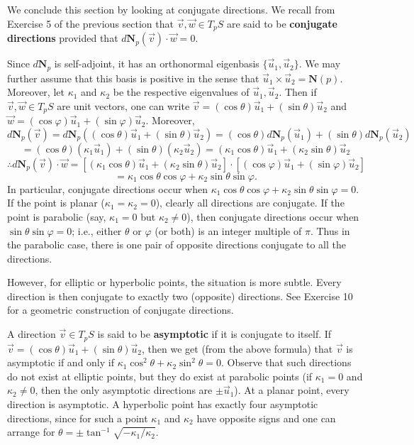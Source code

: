 \documentclass[leqno]{book}
\begin{document}
\noindent We conclude this section by looking at conjugate directions.  We recall from Exercise 5 of the previous section that $\vec v,\vec w\in T_pS$ are said to be \textbf{conjugate directions} provided that $d\mathbf N_p(\vec v)\cdot\vec w=0$.

Since $d\mathbf N_p$ is self-adjoint, it has an orthonormal eigenbasis $\{\vec u_1,\vec u_2\}$.  We may further assume that this basis is positive in the sense that $\vec u_1\times\vec u_2=\mathbf N(p)$.  Moreover, let $\kappa_1$ and $\kappa_2$ be the respective eigenvalues of $\vec u_1,\vec u_2$.  Then if $\vec v,\vec w\in T_pS$ are unit vectors, one can write $\vec v=(\cos\theta)\vec u_1+(\sin\theta)\vec u_2$ and $\vec w=(\cos\varphi)\vec u_1+(\sin\varphi)\vec u_2$.  Moreover,
$$d\mathbf N_p(\vec v)=d\mathbf N_p((\cos\theta)\vec u_1+(\sin\theta)\vec u_2)=(\cos\theta)d\mathbf N_p(\vec u_1)+(\sin\theta)d\mathbf N_p(\vec u_2)$$
$$=(\cos\theta)(\kappa_1\vec u_1)+(\sin\theta)(\kappa_2\vec u_2)=(\kappa_1\cos\theta)\vec u_1+(\kappa_2\sin\theta)\vec u_2$$
$$\therefore d\mathbf N_p(\vec v)\cdot\vec w=[(\kappa_1\cos\theta)\vec u_1+(\kappa_2\sin\theta)\vec u_2]\cdot[(\cos\varphi)\vec u_1+(\sin\varphi)\vec u_2]$$
$$=\kappa_1\cos\theta\cos\varphi+\kappa_2\sin\theta\sin\varphi.$$
In particular, conjugate directions occur when $\kappa_1\cos\theta\cos\varphi+\kappa_2\sin\theta\sin\varphi=0$.  If the point is planar ($\kappa_1=\kappa_2=0$), clearly all directions are conjugate.  If the point is parabolic (say, $\kappa_1=0$ but $\kappa_2\ne 0$), then conjugate directions occur when $\sin\theta\sin\varphi=0$; i.e., either $\theta$ or $\varphi$ (or both) is an integer multiple of $\pi$.  Thus in the parabolic case, there is one pair of opposite directions conjugate to all the directions.

However, for elliptic or hyperbolic points, the situation is more subtle.  Every direction is then conjugate to exactly two (opposite) directions.  See Exercise 10 for a geometric construction of conjugate directions.

A direction $\vec v\in T_pS$ is said to be \textbf{asymptotic} if it is conjugate to itself.  If $\vec v=(\cos\theta)\vec u_1+(\sin\theta)\vec u_2$, then we get (from the above formula) that $\vec v$ is asymptotic if and only if $\kappa_1\cos^2\theta+\kappa_2\sin^2\theta=0$.  Observe that such directions do not exist at elliptic points, but they do exist at parabolic points (if $\kappa_1=0$ and $\kappa_2\ne 0$, then the only asymptotic directions are $\pm\vec u_1$).  At a planar point, every direction is asymptotic.  A hyperbolic point has exactly four asymptotic directions, since for such a point $\kappa_1$ and $\kappa_2$ have opposite signs and one can arrange for $\theta=\pm\tan^{-1}\sqrt{-\kappa_1/\kappa_2}$.
\end{document}
